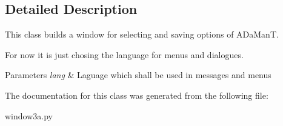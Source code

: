 \subsection{Detailed Description}
This class builds a window for selecting and saving options of A\-Da\-Man\-T. 

For now it is just chosing the language for menus and dialogues. 
\begin{DoxyParams}{Parameters}
{\em lang} & Laguage which shall be used in messages and menus \\
\hline
\end{DoxyParams}


The documentation for this class was generated from the following file\-:\begin{DoxyCompactItemize}
\item 
window3a.\-py\end{DoxyCompactItemize}
